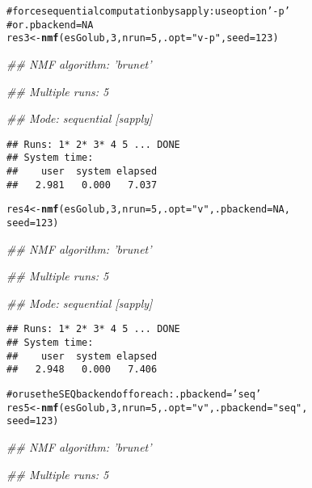 \documentclass[a4paper]{article}\usepackage{graphicx, color}
\makeatletter
\newcommand{\hlfunctioncall}[1]{\textcolor[rgb]{0.501960784313725,0,0.329411764705882}{\textbf{#1}}}%
\newcommand{\hlstring}[1]{\textcolor[rgb]{0.6,0.6,1}{#1}}%
\newcommand{\hlcomment}[1]{\textcolor[rgb]{0.180392156862745,0.6,0.341176470588235}{#1}}%
\newenvironment{kframe}{%
 \def\at@end@of@kframe{}%
 \ifinner\ifhmode%
  \def\at@end@of@kframe{\end{minipage}}%
  \begin{minipage}{\columnwidth}%
 \fi\fi%
 \def\FrameCommand##1{\hskip\@totalleftmargin \hskip-\fboxsep
 \colorbox{shadecolor}{##1}\hskip-\fboxsep
     \hskip-\linewidth \hskip-\@totalleftmargin \hskip\columnwidth}%
 \MakeFramed {\advance\hsize-\width
   \@totalleftmargin\z@ \linewidth\hsize
   \@setminipage}}%
 {\par\unskip\endMakeFramed%
 \at@end@of@kframe}
\newenvironment{knitrout}{}{} %
\makeatother
\begin{document}
\begin{knitrout}
\begin{kframe}
\begin{alltt}
\hlcomment{# force sequential computation by sapply: use option '-p'}
\hlcomment{# or .pbackend=NA}
res3 <- \hlfunctioncall{nmf}(esGolub, 3, nrun = 5, .opt = \hlstring{"v-p"}, seed = 123)
\end{alltt}


{\ttfamily\noindent\itshape\textcolor{messagecolor}{\#\# NMF algorithm: 'brunet'}}

{\ttfamily\noindent\itshape\textcolor{messagecolor}{\#\# Multiple runs: 5}}

{\ttfamily\noindent\itshape\textcolor{messagecolor}{\#\# Mode: sequential [sapply]}}\begin{verbatim}
## Runs: 1* 2* 3* 4 5 ... DONE
## System time:
##    user  system elapsed 
##   2.981   0.000   7.037
\end{verbatim}
\begin{alltt}
res4 <- \hlfunctioncall{nmf}(esGolub, 3, nrun = 5, .opt = \hlstring{"v"}, .pbackend = NA, 
    seed = 123)
\end{alltt}


{\ttfamily\noindent\itshape\textcolor{messagecolor}{\#\# NMF algorithm: 'brunet'}}

{\ttfamily\noindent\itshape\textcolor{messagecolor}{\#\# Multiple runs: 5}}

{\ttfamily\noindent\itshape\textcolor{messagecolor}{\#\# Mode: sequential [sapply]}}\begin{verbatim}
## Runs: 1* 2* 3* 4 5 ... DONE
## System time:
##    user  system elapsed 
##   2.948   0.000   7.406
\end{verbatim}
\begin{alltt}

\hlcomment{# or use the SEQ backend of foreach: .pbackend='seq'}
res5 <- \hlfunctioncall{nmf}(esGolub, 3, nrun = 5, .opt = \hlstring{"v"}, .pbackend = \hlstring{"seq"}, 
    seed = 123)
\end{alltt}


{\ttfamily\noindent\itshape\textcolor{messagecolor}{\#\# NMF algorithm: 'brunet'}}

{\ttfamily\noindent\itshape\textcolor{messagecolor}{\#\# Multiple runs: 5}}


\end{kframe}
\end{knitrout}
\end{document}
